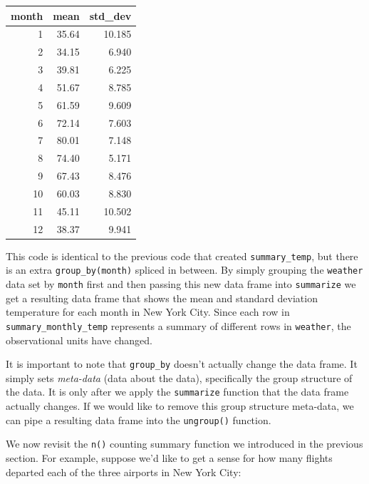\documentclass[]{tufte-book}
\newenvironment{Shaded}{\begin{snugshade}}{\end{snugshade}}
\newcommand{\KeywordTok}[1]{\textcolor[rgb]{0.13,0.29,0.53}{\textbf{{#1}}}}
\newcommand{\DataTypeTok}[1]{\textcolor[rgb]{0.13,0.29,0.53}{{#1}}}
\newcommand{\StringTok}[1]{\textcolor[rgb]{0.31,0.60,0.02}{{#1}}}
\newcommand{\NormalTok}[1]{{#1}}
\begin{document}
\begin{tabular}{r|r|r}
\hline
month & mean & std\_dev\\
\hline
1 & 35.64 & 10.185\\
\hline
2 & 34.15 & 6.940\\
\hline
3 & 39.81 & 6.225\\
\hline
4 & 51.67 & 8.785\\
\hline
5 & 61.59 & 9.609\\
\hline
6 & 72.14 & 7.603\\
\hline
7 & 80.01 & 7.148\\
\hline
8 & 74.40 & 5.171\\
\hline
9 & 67.43 & 8.476\\
\hline
10 & 60.03 & 8.830\\
\hline
11 & 45.11 & 10.502\\
\hline
12 & 38.37 & 9.941\\
\hline
\end{tabular}

This code is identical to the previous code that created
\texttt{summary\_temp}, but there is an extra \texttt{group\_by(month)}
spliced in between. By simply grouping the \texttt{weather} data set by
\texttt{month} first and then passing this new data frame into
\texttt{summarize} we get a resulting data frame that shows the mean and
standard deviation temperature for each month in New York City. Since
each row in \texttt{summary\_monthly\_temp} represents a summary of
different rows in \texttt{weather}, the observational units have
changed.

It is important to note that \texttt{group\_by} doesn't actually change
the data frame. It simply sets \emph{meta-data} (data about the data),
specifically the group structure of the data. It is only after we apply
the \texttt{summarize} function that the data frame actually changes. If
we would like to remove this group structure meta-data, we can pipe a
resulting data frame into the \texttt{ungroup()} function.

We now revisit the \texttt{n()} counting summary function we introduced
in the previous section. For example, suppose we'd like to get a sense
for how many flights departed each of the three airports in New York
City:

\begin{Shaded}
\end{Shaded}
\end{document}
